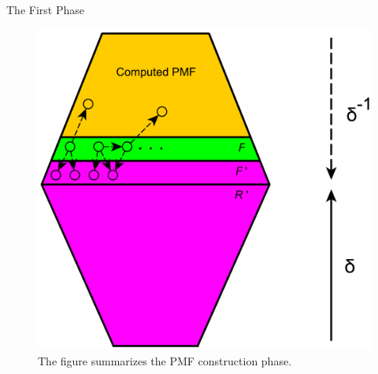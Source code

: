 \documentclass{beamer}
\begin{document}
\begin{frame}{The First Phase}

	\begin{figure}
		\includegraphics[height=0.8\textheight]{figs/f2r.pdf}
		\caption{The figure summarizes the PMF construction phase.}
	\end{figure}
\end{frame}
%
%	
%	
\end{document}
